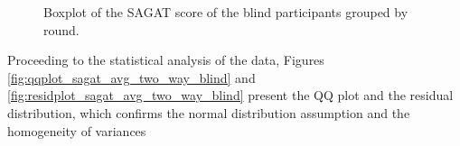 \begin{figure}[!htb]
\begin{minipage}{0.45\textwidth}
        \caption{Boxplot of the SAGAT score of the blind participants grouped by round.}
        \label{fig:boxplot_sagat_blind_rounds}
    \end{minipage}
\end{figure}

%
%

Proceeding to the statistical analysis of the data, Figures \ref{fig:qqplot_sagat_avg_two_way_blind} and \ref{fig:residplot_sagat_avg_two_way_blind} present the QQ plot and the residual distribution, which confirms the normal distribution assumption and the homogeneity of variances

